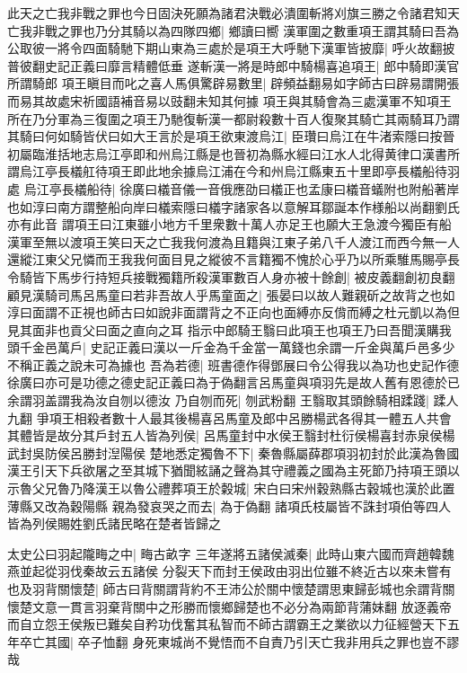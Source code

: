此天之亡我非戰之罪也今日固決死願為諸君決戰必潰圍斬將刈旗三勝之令諸君知天亡我非戰之罪也乃分其騎以為四隊四鄉|{
	鄉讀曰嚮}
漢軍圍之數重項王謂其騎曰吾為公取彼一將令四面騎馳下期山東為三處於是項王大呼馳下漢軍皆披靡|{
	呼火故翻披普彼翻史記正義曰靡言精體低垂}
遂斬漢一將是時郎中騎楊喜追項王|{
	郎中騎即漢官所謂騎郎}
項王瞋目而叱之喜人馬俱驚辟易數里|{
	辟頻益翻易如字師古曰辟易謂開張而易其故處宋祈國語補音易以豉翻未知其何據}
項王與其騎會為三處漢軍不知項王所在乃分軍為三復圍之項王乃馳復斬漢一都尉殺數十百人復聚其騎亡其兩騎耳乃謂其騎曰何如騎皆伏曰如大王言於是項王欲東渡烏江|{
	臣瓚曰烏江在牛渚索隱曰按晉初屬臨淮括地志烏江亭即和州烏江縣是也晉初為縣水經曰江水人北得黄律口漢書所謂烏江亭長檥舡待項王即此地余據烏江浦在今和州烏江縣東五十里即亭長檥船待羽處}
烏江亭長檥船待|{
	徐廣曰檥音儀一音俄應劭曰檥正也孟康曰檥音蟻附也附船著岸也如淳曰南方謂整船向岸曰檥索隱曰檥字諸家各以意解耳鄒誕本作様船以尚翻劉氏亦有此音}
謂項王曰江東雖小地方千里衆數十萬人亦足王也願大王急渡今獨臣有船漢軍至無以渡項王笑曰天之亡我我何渡為且籍與江東子弟八千人渡江而西今無一人還縱江東父兄憐而王我我何面目見之縱彼不言籍獨不愧於心乎乃以所乘騅馬賜亭長令騎皆下馬步行持短兵接戰獨籍所殺漢軍數百人身亦被十餘創|{
	被皮義翻創初良翻}
顧見漢騎司馬呂馬童曰若非吾故人乎馬童面之|{
	張晏曰以故人難親斫之故背之也如淳曰面謂不正視也師古曰如說非面謂背之不正向也面縛亦反偝而縛之杜元凱以為但見其面非也貢父曰面之直向之耳}
指示中郎騎王翳曰此項王也項王乃曰吾聞漢購我頭千金邑萬戶|{
	史記正義曰漢以一斤金為千金當一萬錢也余謂一斤金與萬戶邑多少不稱正義之說未可為據也}
吾為若德|{
	班書德作得鄧展曰令公得我以為功也史記作德徐廣曰亦可是功德之德史記正義曰為于偽翻言呂馬童與項羽先是故人舊有恩德於已余謂羽盖謂我為汝自刎以德汝}
乃自刎而死|{
	刎武粉翻}
王翳取其頭餘騎相蹂踐|{
	蹂人九翻}
爭項王相殺者數十人最其後楊喜呂馬童及郎中呂勝楊武各得其一體五人共會其體皆是故分其戶封五人皆為列侯|{
	呂馬童封中水侯王翳封杜衍侯楊喜封赤泉侯楊武封吳防侯呂勝封湼陽侯}
楚地悉定獨魯不下|{
	秦魯縣屬薛郡項羽初封於此漢為魯國}
漢王引天下兵欲屠之至其城下猶聞絃誦之聲為其守禮義之國為主死節乃持項王頭以示魯父兄魯乃降漢王以魯公禮葬項王於糓城|{
	宋白曰宋州穀熟縣古穀城也漢於此置薄縣又改為穀陽縣}
親為發哀哭之而去|{
	為于偽翻}
諸項氏枝屬皆不誅封項伯等四人皆為列侯賜姓劉氏諸民略在楚者皆歸之

太史公曰羽起隴畮之中|{
	畮古畝字}
三年遂將五諸侯滅秦|{
	此時山東六國而齊趙韓魏燕並起從羽伐秦故云五諸侯}
分裂天下而封王侯政由羽出位雖不終近古以來未嘗有也及羽背關懷楚|{
	師古曰背關謂背約不王沛公於關中懷楚謂思東歸彭城也余謂背關懷楚文意一貫言羽棄背關中之形勝而懷鄉歸楚也不必分為兩節背蒲妹翻}
放逐義帝而自立怨王侯叛已難矣自矜功伐奮其私智而不師古謂霸王之業欲以力征經營天下五年卒亡其國|{
	卒子恤翻}
身死東城尚不覺悟而不自責乃引天亡我非用兵之罪也豈不謬哉

